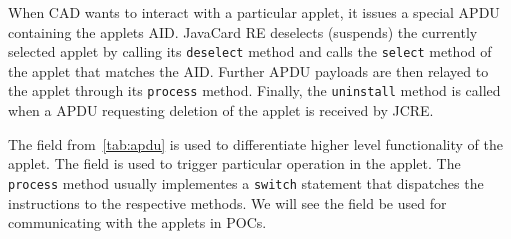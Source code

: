 
When CAD wants to interact with a particular applet, it issues a special APDU containing the applets AID. JavaCard RE deselects (suspends) the currently selected applet by calling its \texttt{deselect} method and calls the \texttt{select} method of the applet that matches the AID. Further APDU payloads are then relayed to the applet through its \texttt{process} method. Finally, the \texttt{uninstall} method is called when a APDU requesting deletion of the applet is received by JCRE.

    The \cla field from~\ref{tab:apdu} is used to differentiate higher level functionality of the applet. The \ins field is used to trigger particular operation in the applet. The \texttt{process} method usually implementes a \texttt{switch} statement that dispatches the \ins instructions to the respective methods. We will see the \ins field be used for communicating with the applets in POCs.






